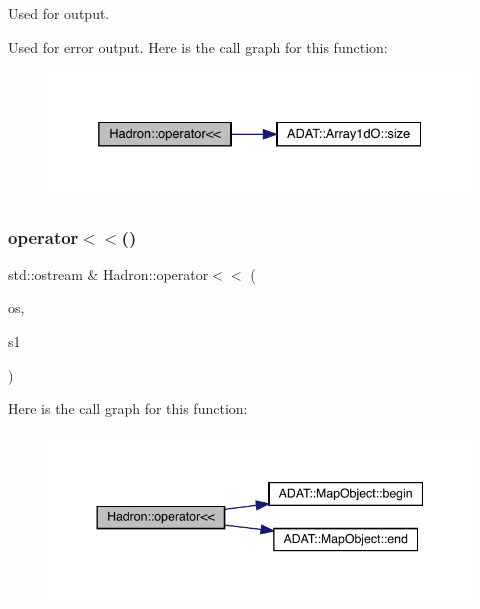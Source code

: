 Used for output. 

Used for error output. Here is the call graph for this function\+:\nopagebreak
\begin{figure}[H]
\begin{center}
\leavevmode
\includegraphics[width=332pt]{d1/daf/namespaceHadron_a243db37c66ec71b086f54a64d62fa659_cgraph}
\end{center}
\end{figure}
\mbox{\label{namespaceHadron_af9e168289a71f406cf53d10783cc513c}} 
\subsubsection{\texorpdfstring{operator$<$$<$()}{operator<<()}\hspace{0.1cm}{\footnotesize\ttfamily [41/48]}}
{\footnotesize\ttfamily std\+::ostream \& Hadron\+::operator$<$$<$ (\begin{DoxyParamCaption}\item[{std\+::ostream \&}]{os,  }\item[{const \mbox{\hyperlink{namespaceHadron_a22279e56b59508dc8dd2c8991dc911fd}{Map\+Single\+Hadron\+Quark\+Spin\+\_\+t}} \&}]{s1 }\end{DoxyParamCaption})}

Here is the call graph for this function\+:\nopagebreak
\begin{figure}[H]
\begin{center}
\leavevmode
\includegraphics[width=344pt]{d1/daf/namespaceHadron_af9e168289a71f406cf53d10783cc513c_cgraph}
\end{center}
\end{figure}
\mbox{\label{namespaceHadron_af6547a2cdd6369eda030067e469096bf}} 
